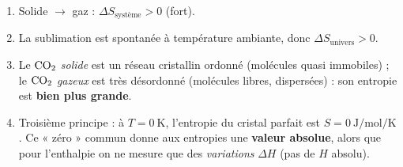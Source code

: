 \documentclass[11pt,a4paper]{article}
\newcommand{\dS}{\Delta S}
\newcommand{\dH}{\Delta H}
\newcommand{\rep}[1]{\textcolor{primarydark}{\textbf{#1}}}
\begin{document}
\begin{correction}
\begin{enumerate}[label=\alph*),leftmargin=2em,topsep=2pt,itemsep=2pt]
  \item Solide $\to$ gaz : \rep{$\dS_{\text{système}}>0$} (fort).
  \item La sublimation est spontanée à température ambiante, donc \rep{$\dS_{\text{univers}}>0$}.
  \item Le $\ce{CO2}$ \emph{solide} est un réseau cristallin ordonné (molécules quasi immobiles) ; le
        $\ce{CO2}$ \emph{gazeux} est très désordonné (molécules libres, dispersées) : son entropie est
        \rep{bien plus grande}.
  \item Troisième principe : à $T=\SI{0}{\kelvin}$, l'entropie du cristal parfait est
        \rep{$S=\SI{0}{\joule\per\mol\per\kelvin}$}. Ce « zéro » commun donne aux entropies une
        \rep{valeur absolue}, alors que pour l'enthalpie on ne mesure que des \emph{variations} $\dH$
        (pas de $H$ absolu).
\end{enumerate}
\end{correction}
\end{document}
